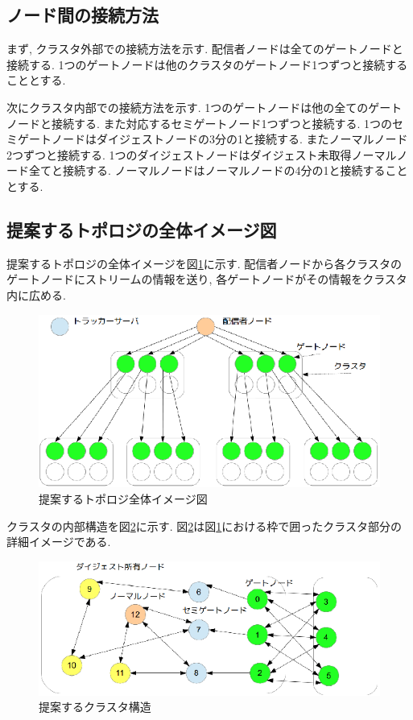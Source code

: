 \documentclass[letter]{ieicej}
\begin{document}
\subsection{ノード間の接続方法}
まず, クラスタ外部での接続方法を示す. 配信者ノードは全てのゲートノードと接続する. 1つのゲートノードは他のクラスタのゲートノード1つずつと接続することとする.

次にクラスタ内部での接続方法を示す. 1つのゲートノードは他の全てのゲートノードと接続する. また対応するセミゲートノード1つずつと接続する. 1つのセミゲートノードはダイジェストノードの3分の1と接続する. またノーマルノード2つずつと接続する. 1つのダイジェストノードはダイジェスト未取得ノーマルノード全てと接続する. ノーマルノードはノーマルノードの4分の1と接続することとする.

\subsection{提案するトポロジの全体イメージ図}
提案するトポロジの全体イメージを図\ref{fig:fig04}に示す. 配信者ノードから各クラスタのゲートノードにストリームの情報を送り, 各ゲートノードがその情報をクラスタ内に広める.

\begin{figure}[h]
  \begin{center}
    \includegraphics{fig4.eps}
  \end{center}
  \caption{提案するトポロジ全体イメージ図}
  \label{fig:fig04}
\end{figure}

クラスタの内部構造を図\ref{fig:fig05}に示す. 図\ref{fig:fig05}は図\ref{fig:fig04}における枠で囲ったクラスタ部分の詳細イメージである.

\begin{figure}[h]
  \begin{center}
    \includegraphics{fig5.eps}
  \end{center}
  \caption{提案するクラスタ構造}
  \label{fig:fig05}
\end{figure}
\end{document}
